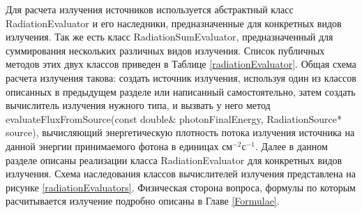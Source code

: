Для расчета излучения источников используется абстрактный класс RadiationEvaluator и его наследники, предназначенные для конкретных видов излучения. Так же есть класс RadiationSumEvaluator, предназначенный для суммирования нескольких различных видов излучения. Список публичных методов этих двух классов приведен в Таблице \ref{radiationEvaluator}. Общая схема расчета излучения такова: создать источник излучения, используя один из классов описанных в предыдущем разделе или написанный самостоятельно, затем создать вычислитель излучения нужного типа, и вызвать у него метод evaluateFluxFromSource(const double\& photonFinalEnergy, RadiationSource* source), вычисляющий энергетическую плотность потока излучения источника на данной энергии принимаемого фотона в единицах  $\text{см}^{-2} \text{с}^{-1}$. Далее в данном разделе описаны реализации класса RadiationEvaluator для конкретных видов излучения. Схема наследования классов вычислителей излучения представлена на рисунке \ref{radiationEvaluators}. Физическая сторона вопроса, формулы по которым расчитывается излучение подробно описаны в Главе \ref{Formulae}.

